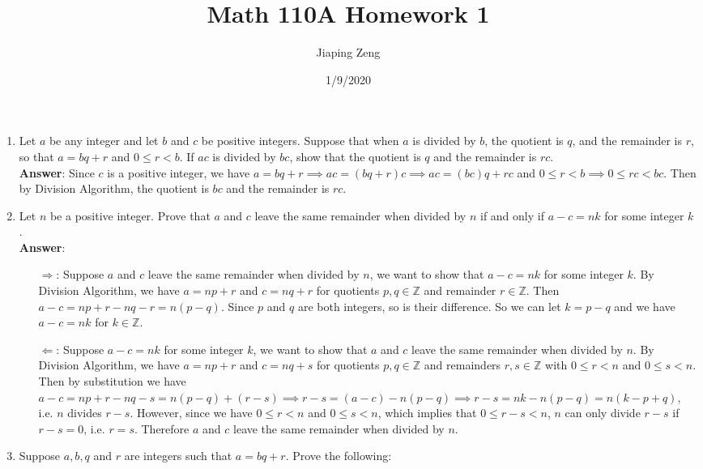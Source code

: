 \documentclass{article}
\title{Math 110A Homework 1}
\date{1/9/2020}
\author{Jiaping Zeng}
\begin{document}
\maketitle

\begin{enumerate}
      \item Let $a$ be any integer and let $b$ and $c$ be positive integers. Suppose that when $a$ is divided by $b$, the quotient is $q$, and the remainder is $r$, so that $a=bq+r$ and $0\leq r<b$. If $ac$ is divided by $bc$, show that the quotient is $q$ and the remainder is $rc$.\\
            \textbf{Answer}: Since $c$ is a positive integer, we have $a=bq+r\implies ac=(bq+r)c\implies ac=(bc)q+rc$ and $0\leq r<b\implies 0\leq rc<bc$. Then by Division Algorithm, the quotient is $bc$ and the remainder is $rc$.
      \item Let $n$ be a positive integer. Prove that $a$ and $c$ leave the same remainder when divided by $n$ if and only if $a-c=nk$ for some integer $k$.\\
            \textbf{Answer}:\begin{itemize}
                  \item [$\Rightarrow$:] Suppose $a$ and $c$ leave the same remainder when divided by $n$, we want to show that $a-c=nk$ for some integer $k$. By Division Algorithm, we have $a=np+r$ and $c=nq+r$ for quotients $p,q\in\mathbb{Z}$ and remainder $r\in\mathbb{Z}$. Then $a-c=np+r-nq-r=n(p-q)$. Since $p$ and $q$ are both integers, so is their difference. So we can let $k=p-q$ and we have $a-c=nk$ for $k\in\mathbb{Z}$.
                  \item [$\Leftarrow$:] Suppose $a-c=nk$ for some integer $k$, we want to show that $a$ and $c$ leave the same remainder when divided by $n$. By Division Algorithm, we have $a=np+r$ and $c=nq+s$ for quotients $p,q\in\mathbb{Z}$ and remainders $r,s\in\mathbb{Z}$ with $0\leq r<n$ and $0\leq s<n$. Then by substitution we have $a-c=np+r-nq-s=n(p-q)+(r-s)\implies r-s=(a-c)-n(p-q)\implies r-s=nk-n(p-q)=n(k-p+q)$, i.e. $n$ divides $r-s$. However, since we have $0\leq r<n$ and $0\leq s<n$, which implies that $0\leq r-s<n$, $n$ can only divide $r-s$ if $r-s=0$, i.e. $r=s$. Therefore $a$ and $c$ leave the same remainder when divided by $n$.
            \end{itemize}
      \item Suppose $a,b,q$ and $r$ are integers such that $a=bq+r$. Prove the following:
            \begin{enumerate}

\end{enumerate}
\end{enumerate}
\end{document}
